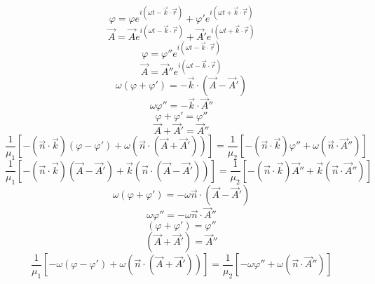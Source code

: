 \begin{equation}
    \varphi=\varphi e^{i(\omega t-\vec{k}\cdot\vec{r})}+\varphi' e^{i(\omega t+\vec{k}\cdot\vec{r})}
\end{equation}
\begin{equation}
    \vec{A}=\vec{A} e^{i(\omega t-\vec{k}\cdot\vec{r})}+\vec{A}' e^{i(\omega t+\vec{k}\cdot\vec{r})}
\end{equation}
\begin{equation}
    \varphi=\varphi''e^{i(\omega t-\vec{k}\cdot\vec{r})}
\end{equation}
\begin{equation}
    \vec{A}=\vec{A}''e^{i(\omega t-\vec{k}\cdot\vec{r})}
\end{equation}
\begin{equation}
    \omega(\varphi+\varphi')=-\vec{k}\cdot(\vec{A}-\vec{A}')
\end{equation}
\begin{equation}
    \omega\varphi''=-\vec{k}\cdot\vec{A}''
\end{equation}
\begin{equation}
    \varphi+\varphi'=\varphi''
\end{equation}
\begin{equation}
    \vec{A}+\vec{A}'=\vec{A}''
\end{equation}
\begin{equation}
    \frac{1}{\mu_1}[-(\vec{n}\cdot\vec{k})(\varphi-\varphi')+\omega(\vec{n}\cdot(\vec{A}+\vec{A}'))]=\frac{1}{\mu_2}[-(\vec{n}\cdot\vec{k})\varphi''+\omega(\vec{n}\cdot\vec{A}'')]
\end{equation}
\begin{equation}
    \frac{1}{\mu_1}[-(\vec{n}\cdot\vec{k})(\vec{A}-\vec{A}')+\vec{k}(\vec{n}\cdot(\vec{A}-\vec{A}'))]=\frac{1}{\mu_2}[-(\vec{n}\cdot\vec{k})\vec{A}''+\vec{k}(\vec{n}\cdot\vec{A}'')]
\end{equation}
\begin{equation}
    \omega(\varphi+\varphi')=-\omega\vec{n}\cdot(\vec{A}-\vec{A}')
\end{equation}
\begin{equation}
    \omega\varphi''=-\omega\vec{n}\cdot\vec{A}''
\end{equation}
\begin{equation}
    (\varphi+\varphi')=\varphi''
\end{equation}
\begin{equation}
    (\vec{A}+\vec{A}')=\vec{A}''
\end{equation}
\begin{equation}
    \frac{1}{\mu_1}[-\omega(\varphi-\varphi')+\omega(\vec{n}\cdot(\vec{A}+\vec{A}'))]=\frac{1}{\mu_2}[-\omega\varphi''+\omega(\vec{n}\cdot\vec{A}'')]
\end{equation}
